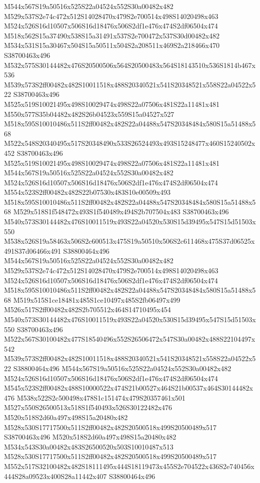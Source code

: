 \documentclass{article}
\begin{document}
\begin{multicols}{2}
M544x567S19a50516x525S22a04524x552S30a00482x482 M529x537S2e74c472x512S14028470x479S2e700514x498S14020498x463 M524x526S16d10507x506S16d18476x506S2df1e476x474S2df06504x474 M518x562S15a37490x538S15a31491x537S2e700472x537S30d00482x482 M534x531S15a30467x504S15a50511x504S2a208511x469S2a218466x470 S38700463x496 M532x575S30144482x476S20500506x564S20500483x564S18143510x536S1814b467x536 M539x573S2ff00482x482S10011518x488S20340521x541S20348521x558S22a04522x522 S38700463x496 M525x519S10021495x498S10029474x498S22a07506x481S22a11481x481 M550x577S35b04482x482S26b04523x559S15a04527x527 M518x595S10010486x511S2ff00482x482S22a04488x547S20348484x580S15a51488x568 M522x548S20340495x517S20348490x533S26524493x493S15248477x460S15240502x452 S38700463x496 M525x519S10021495x498S10029474x498S22a07506x481S22a11481x481 M544x567S19a50516x525S22a04524x552S30a00482x482 M524x526S16d10507x506S16d18476x506S2df1e476x474S2df06504x474 M554x523S2ff00482x482S22b07530x483S10e00509x493 M518x595S10010486x511S2ff00482x482S22a04488x547S20348484x580S15a51488x568 M529x518S1f548472x493S1f540489x494S2b707504x483 S38700463x496 M540x573S30144482x476S10011519x493S22a04520x530S15d39495x547S15d51503x550 M538x526S19a58463x506S2c600513x475S19a50510x506S2c611468x475S37d06525x491S37d06466x491 S38800464x496 M544x567S19a50516x525S22a04524x552S30a00482x482 M529x537S2e74c472x512S14028470x479S2e700514x498S14020498x463 M524x526S16d10507x506S16d18476x506S2df1e476x474S2df06504x474 M518x595S10010486x511S2ff00482x482S22a04488x547S20348484x580S15a51488x568 M519x515S1ce18481x485S1ce10497x485S2fb06497x499 M526x517S2ff00482x482S2b705512x464S14710495x454 M540x573S30144482x476S10011519x493S22a04520x530S15d39495x547S15d51503x550 S38700463x496 M522x567S30100482x477S18540496x552S26506472x547S30a00482x488S22104497x542 M539x573S2ff00482x482S10011518x488S20340521x541S20348521x558S22a04522x522 S38800464x496 M544x567S19a50516x525S22a04524x552S30a00482x482 M524x526S16d10507x506S16d18476x506S2df1e476x474S2df06504x474 M545x523S2ff00482x488S10000522x474S21b00527x464S21b00537x464S30144482x476 M538x522S2c500498x478S1c151474x479S20357461x501 M527x550S26500513x518S1f540493x526S30122482x476 M520x518S2d60a497x498S15a20480x482 M528x530S17717500x511S2ff00482x482S20500518x499S20500489x517 S38700463x496 M520x518S2d60a497x498S15a20480x482 M534x543S30a00482x483S26500520x503S10010487x513 M528x530S17717500x511S2ff00482x482S20500518x499S20500489x517 M552x517S32100482x482S18111495x444S18119473x455S2e704522x436S2e740456x444S28a09523x400S28a11442x407 S38800464x496



\end{multicols}
\end{document}
